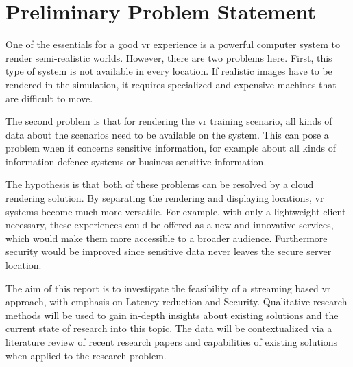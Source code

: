 \section{Preliminary Problem Statement}
One of the essentials for a good \acrfull{vr} experience is a powerful computer system to render semi-realistic
worlds. However, there are two problems here. First, this type of system is not available in every location.
If realistic images have to be rendered in the simulation, it requires specialized and expensive machines that are difficult to move. 

The second problem is that for rendering the \acrshort{vr} training scenario, all kinds of data about the scenarios need to be available on the system. 
This can pose a problem when it concerns sensitive information, for example about all kinds of information defence systems or business sensitive information.


The hypothesis is that both of these problems can be resolved by a cloud rendering solution. By separating the rendering and displaying locations, \acrshort{vr} systems become much more versatile. For example, with only a lightweight client necessary, these experiences could be offered as a new and innovative services, which would make them more accessible to a broader audience. Furthermore security would be improved since sensitive data never leaves the secure server location.


The aim of this report is to investigate the feasibility of a streaming based \acrshort{vr} approach, with emphasis on Latency reduction and Security.
Qualitative research methods will be used to gain in-depth insights about existing solutions and the current state of research into this topic.
The data will be contextualized via a literature review of recent research papers and capabilities of existing solutions when applied to the research problem.